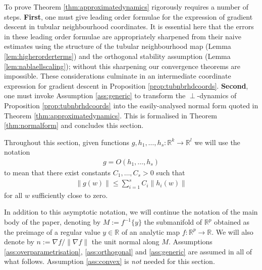 \documentclass{article}
\newcommand{\RB}{\mathbb{R}}
\theoremstyle{plain}
\theoremstyle{definition}
\theoremstyle{remark}
\begin{document}
To prove Theorem \ref{thm:approximatedynamics} rigorously requires a number of steps. \textbf{First}, one must give leading order formulae for the expression of gradient descent in tubular neighbourhood coordinates. It is essential here that the errors in these leading order formulae are appropriately sharpened from their naive estimates using the structure of the tubular neighbourhood map (Lemma \ref{lem:higherorderterms}) and the orthogonal stability assumption (Lemma \ref{lem:nablaellscaling}); without this sharpening our convergence theorems are impossible. These considerations culminate in an intermediate coordinate expression for gradient descent in Proposition \ref{prop:tubnbrhdcoords}. \textbf{Second}, one must invoke Assumption \ref{ass:generic} to transform the $\perp$-dynamics of Proposition \ref{prop:tubnbrhdcoords} into the easily-analysed normal form quoted in Theorem \ref{thm:approximatedynamics}. This is formalised in Theorem \ref{thm:normalform} and concludes this section.

Throughout this section, given functions $g,h_1,\dots,h_s:\RB^k\rightarrow\RB^l$ we will use the notation
\begin{align}
    g = O(h_1,\dots,h_s)
\end{align}
to mean that there exist constants $C_1,\dots,C_s>0$ such that
\begin{align}
    \|g(w)\|\leq \sum_{i=1}^sC_i\|h_i(w)\|
\end{align}
for all $w$ sufficiently close to zero.

In addition to this asymptotic notation, we will continue the notation of the main body of the paper, denoting by $M:=f^{-1}\{y\}$ the submanifold of $\RB^p$ obtained as the preimage of a regular value $y\in\RB$ of an analytic map $f:\RB^p\rightarrow\RB$. We will also denote by $n:=\nabla f/\|\nabla f\|$ the unit normal along $M$. Assumptions \ref{ass:overparametrisation}, \ref{ass:orthogonal} and \ref{ass:generic} are assumed in all of what follows. Assumption \ref{ass:convex} is \emph{not} needed for this section.
\end{document}
